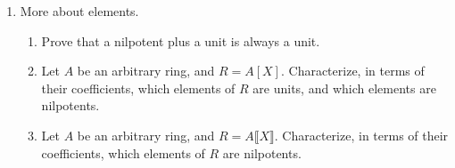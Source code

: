 \documentclass[12pt]{amsart}
\newcommand\itemB{\stepcounter{enumi}\item[(\theenumi)]}
\begin{document}
\begin{enumerate}
\itemB More about elements.
\begin{enumerate}
\item Prove that a nilpotent plus a unit is always a unit.
\item Let $A$ be an arbitrary ring, and $R=A[X]$. Characterize, in terms of their coefficients, which elements of $R$ are units, and which elements are nilpotents.
\item Let $A$ be an arbitrary ring, and $R=A\llbracket X\rrbracket$. Characterize, in terms of their coefficients, which elements of $R$ are nilpotents.
\end{enumerate}





\end{enumerate}
\end{document}

